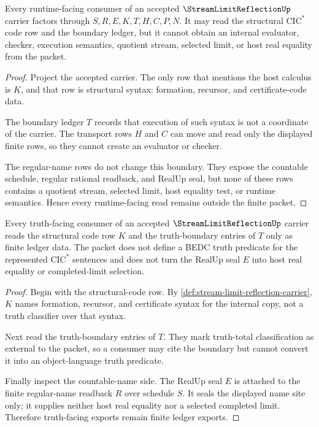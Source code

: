 \begin{theorem}
\label{thm:stream-limit-reflection-runtime-boundary}
Every runtime-facing consumer of an accepted $\StreamLimitReflectionUp$ carrier factors through $S,R,E,K,T,H,C,P,N$. It may read the structural $\mathrm{CIC}^{*}$ code row and the boundary ledger, but it cannot obtain an internal evaluator, checker, execution semantics, quotient stream, selected limit, or host real equality from the packet.
\end{theorem}
\begin{proof}
Project the accepted carrier. The only row that mentions the host calculus is $K$, and that row is structural syntax: formation, recursor, and certificate-code data.

The boundary ledger $T$ records that execution of such syntax is not a coordinate of the carrier. The transport rows $H$ and $C$ can move and read only the displayed finite rows, so they cannot create an evaluator or checker.

The regular-name rows do not change this boundary. They expose the countable schedule, regular rational readback, and RealUp seal, but none of these rows contains a quotient stream, selected limit, host equality test, or runtime semantics. Hence every runtime-facing read remains outside the finite packet.
\end{proof}

\begin{theorem}
\label{thm:stream-limit-reflection-truth-nonclosure}
Every truth-facing consumer of an accepted $\StreamLimitReflectionUp$ carrier reads the structural code row $K$ and the truth-boundary entries of $T$ only as finite ledger data. The packet does not define a BEDC truth predicate for the represented $\mathrm{CIC}^{*}$ sentences and does not turn the RealUp seal $E$ into host real equality or completed-limit selection.
\end{theorem}
\begin{proof}
Begin with the structural-code row. By \autoref{def:stream-limit-reflection-carrier}, $K$ names formation, recursor, and certificate syntax for the internal copy, not a truth classifier over that syntax.

Next read the truth-boundary entries of $T$. They mark truth-total classification as external to the packet, so a consumer may cite the boundary but cannot convert it into an object-language truth predicate.

Finally inspect the countable-name side. The RealUp seal $E$ is attached to the finite regular-name readback $R$ over schedule $S$. It seals the displayed name site only; it supplies neither host real equality nor a selected completed limit. Therefore truth-facing exports remain finite ledger exports.
\end{proof}

